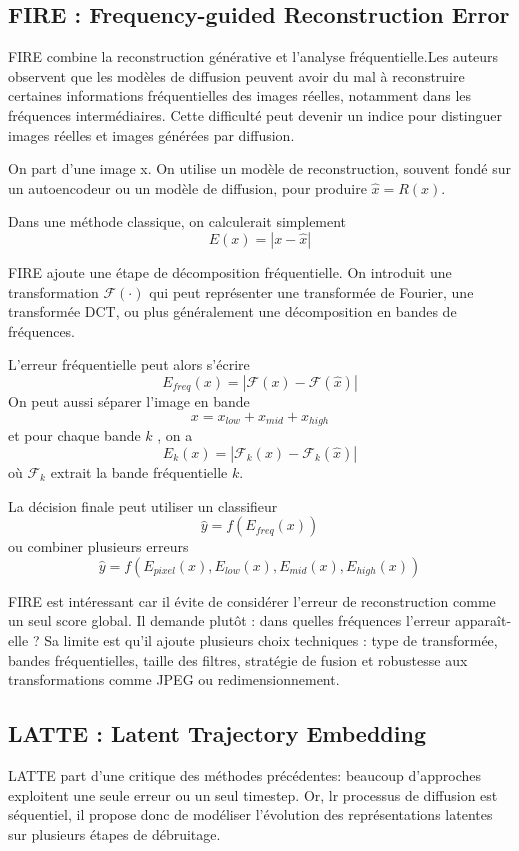 \documentclass[runningheads]{llncs}
\begin{document}
\subsection{FIRE : Frequency-guided Reconstruction Error}
FIRE \citep{Chu_2025} combine la reconstruction générative et l’analyse fréquentielle.Les auteurs observent que les modèles de diffusion peuvent avoir du mal à reconstruire certaines informations fréquentielles des images réelles, notamment dans les fréquences intermédiaires. Cette difficulté peut devenir un indice pour distinguer images réelles et images générées par diffusion.

On part d’une image x. On utilise un modèle de reconstruction, souvent fondé sur un autoencodeur ou un modèle de diffusion, pour produire $\hat{x}=R(x)$.

Dans une méthode classique, on calculerait simplement
$$
    E(x)=|x-\hat{x}|
$$

FIRE ajoute une étape de décomposition fréquentielle. On introduit une transformation $\mathcal{F}(\cdot)$ qui peut représenter une transformée de Fourier, une transformée DCT, ou plus généralement une décomposition en bandes de fréquences.

L’erreur fréquentielle peut alors s’écrire
$$
    E_{freq}(x)=|\mathcal{F}(x)-\mathcal{F}(\hat{x})|
$$
On peut aussi séparer l'image en bande
$$
    x=x_{low}+x_{mid}+x_{high}
$$
et pour chaque bande $k$ , on a 
$$
    E_k(x)=|\mathcal{F}_k(x)-\mathcal{F}_k(\hat{x})|
$$
où $\mathcal{F}_k$ extrait la bande fréquentielle $k$.

La décision finale peut utiliser un classifieur 
$$
    \hat{y}=f(E_{freq}(x))
$$ 
ou combiner plusieurs erreurs 
$$
    \hat{y}=f(E_{pixel}(x),E_{low}(x),E_{mid}(x),E_{high}(x))
$$

FIRE est intéressant car il évite de considérer l’erreur de reconstruction comme un seul score global. Il demande plutôt : dans quelles fréquences l’erreur apparaît-elle ? Sa limite est qu’il ajoute plusieurs choix techniques : type de transformée, bandes fréquentielles, taille des filtres, stratégie de fusion et robustesse aux transformations comme JPEG ou redimensionnement.






\subsection{LATTE : Latent Trajectory Embedding}
LATTE \citep{vasilcoiu2025lattelatenttrajectoryembedding} part d'une critique des méthodes précédentes: beaucoup d'approches exploitent une seule erreur ou un seul timestep. Or, lr processus de diffusion est séquentiel, il propose donc de modéliser l'évolution des représentations latentes sur plusieurs étapes de débruitage.
\end{document}
